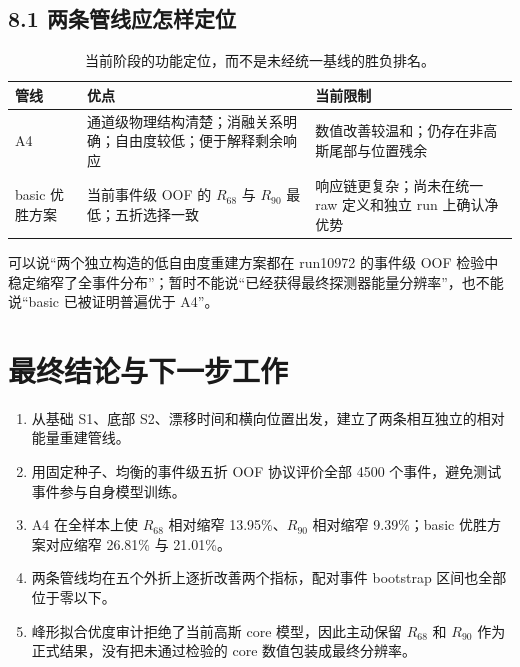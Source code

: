 \documentclass[UTF8,11pt,a4paper,oneside,fontset=none]{ctexart}
\newcommand{\Rsixtyeight}{R_{68}}
\newcommand{\Rninty}{R_{90}}
\begin{document}
\subsection*{8.1 两条管线应怎样定位}

\begin{table}[H]
\centering
\small
\caption{当前阶段的功能定位，而不是未经统一基线的胜负排名。}
\begin{tabularx}{\textwidth}{@{}C{3.0cm}Y Y@{}}
\toprule
管线 & 优点 & 当前限制\\
\midrule
A4 & 通道级物理结构清楚；消融关系明确；自由度较低；便于解释剩余响应 & 数值改善较温和；仍存在非高斯尾部与位置残余\\
basic 优胜方案 & 当前事件级 OOF 的 \(\Rsixtyeight\) 与 \(\Rninty\) 最低；五折选择一致 & 响应链更复杂；尚未在统一 raw 定义和独立 run 上确认净优势\\
\bottomrule
\end{tabularx}
\end{table}

\begin{warningbox}[title={最稳妥的阶段性表述},fonttitle=\bfseries]
可以说“两个独立构造的低自由度重建方案都在 run10972 的事件级 OOF 检验中稳定缩窄了全事件分布”；暂时不能说“已经获得最终探测器能量分辨率”，也不能说“basic 已被证明普遍优于 A4”。
\end{warningbox}
\clearpage

\section{最终结论与下一步工作}

\begin{resultbox}[title={本阶段已经做到的事情},fonttitle=\bfseries]
\begin{enumerate}
  \item 从基础 S1、底部 S2、漂移时间和横向位置出发，建立了两条相互独立的相对能量重建管线。
  \item 用固定种子、均衡的事件级五折 OOF 协议评价全部 4500 个事件，避免测试事件参与自身模型训练。
  \item A4 在全样本上使 \(\Rsixtyeight\) 相对缩窄 13.95\%、\(\Rninty\) 相对缩窄 9.39\%；basic 优胜方案对应缩窄 26.81\% 与 21.01\%。
  \item 两条管线均在五个外折上逐折改善两个指标，配对事件 bootstrap 区间也全部位于零以下。
  \item 峰形拟合优度审计拒绝了当前高斯 core 模型，因此主动保留 \(\Rsixtyeight\) 和 \(\Rninty\) 作为正式结果，没有把未通过检验的 core 数值包装成最终分辨率。
\end{enumerate}
\end{resultbox}
\end{document}
